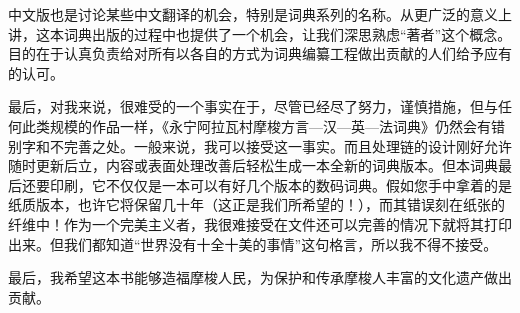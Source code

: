 中文版也是讨论某些中文翻译的机会，特别是词典系列的名称。从更广泛的意义上讲，这本词典出版的过程中也提供了一个机会，让我们深思熟虑“著者”这个概念。目的在于认真负责给对所有以各自的方式为词典编纂工程做出贡献的人们给予应有的认可。

最后，对我来说，很难受的一个事实在于，尽管已经尽了努力，谨慎措施，但与任何此类规模的作品一样，《永宁阿拉瓦村摩梭方言—汉—英—法词典》仍然会有错别字和不完善之处。一般来说，我可以接受这一事实。而且处理链的设计刚好允许随时更新后立，内容或表面处理改善后轻松生成一本全新的词典版本。但本词典最后还要印刷，它不仅仅是一本可以有好几个版本的数码词典。假如您手中拿着的是纸质版本，也许它将保留几十年（这正是我们所希望的！），而其错误刻在纸张的纤维中！作为一个完美主义者，我很难接受在文件还可以完善的情况下就将其打印出来。但我们都知道“世界没有十全十美的事情”这句格言，所以我不得不接受。

最后，我希望这本书能够造福摩梭人民，为保护和传承摩梭人丰富的文化遗产做出贡献。

\bigskip

\hfill \benjaminfra
